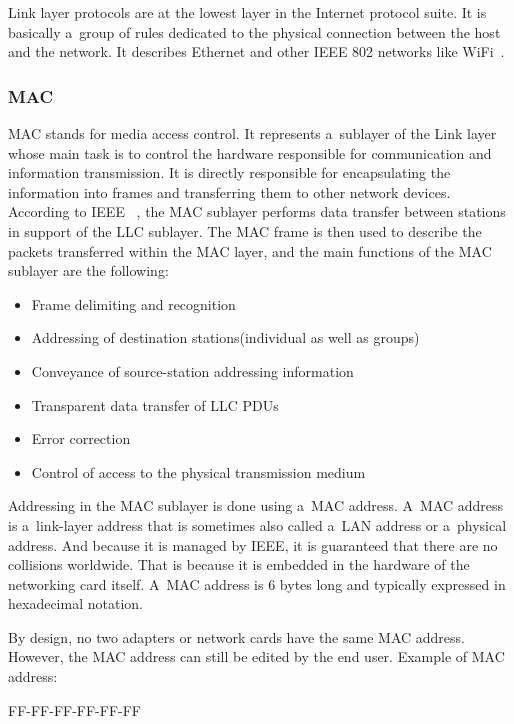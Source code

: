 \documentclass[
  printed,     %
  color,       %
  oneside,     %
  nosansbold,  %
  nocolorbold, %
  nolof,         %
  nolot,         %
]{fithesis4}
\begin{document}
Link layer protocols are at the lowest layer in the Internet protocol suite. It is basically a~group of rules dedicated to the physical connection between the host and the network. It describes Ethernet and other IEEE 802 networks like WiFi~\cite{10.5555/2584507}.

\subsubsection{MAC}
\label{chap:mac}
MAC stands for media access control. It represents a~sublayer of the Link layer whose main task is to control the hardware responsible for communication and information transmission. It is directly responsible for encapsulating the information into frames and transferring them to other network devices. According to IEEE ~\cite{IEEEStd80:online}, the MAC sublayer performs data transfer between stations in support of the LLC sublayer. The MAC frame is then used to describe the packets transferred within the MAC layer, and the main functions of the MAC sublayer are the following:

\begin{itemize}[noitemsep,topsep=0pt]
    \item Frame delimiting and recognition
    \item Addressing of destination stations(individual as well as groups)
    \item Conveyance of source-station addressing information
    \item Transparent data transfer of LLC PDUs
    \item Error correction
    \item Control of access to the physical transmission medium
\end{itemize}

\bigskip
Addressing in the MAC sublayer is done using a~MAC address. A~MAC address is a~link-layer address that is sometimes also called a~LAN address or a~physical address. And because it is managed by IEEE, it is guaranteed that there are no collisions worldwide. That is because it is embedded in the hardware of the networking card itself. A~MAC address is 6 bytes long and typically expressed in hexadecimal notation.

By design, no two adapters or network cards have the same MAC address. However, the MAC address can still be edited by the end user. Example of MAC address:

\begin{center}
    FF-FF-FF-FF-FF-FF
\end{center}
\end{document}
